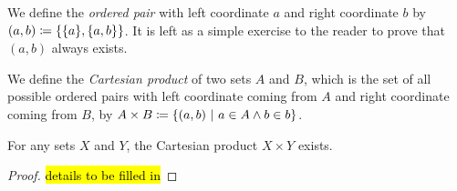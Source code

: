 \begin{definition}
    We define the \emph{ordered pair} with left coordinate \(a\) and right coordinate \(b\)
    by \((a, b) \defn \set*{\set*{a}, \set*{a, b}}\).
    It is left as a simple exercise to the reader to prove that \((a, b)\) always exists.
\end{definition}

% 
%         
% 
% 
% 

\begin{definition}
    We define the \emph{Cartesian product} of two sets \(A\) and \(B\),
    which is the set of all possible ordered pairs with
    left coordinate coming from \(A\) and right coordinate coming from \(B\),
    by \(A \times B \defn \set*{(a, b) \suchthat a \in A \meet b \in b}\).
\end{definition}

\begin{theorem}
    For any sets \(X\) and \(Y\), the Cartesian product \(X \times Y\) exists.
\end{theorem}
\begin{proof}
    \hl{details to be filled in}  %
\end{proof}

